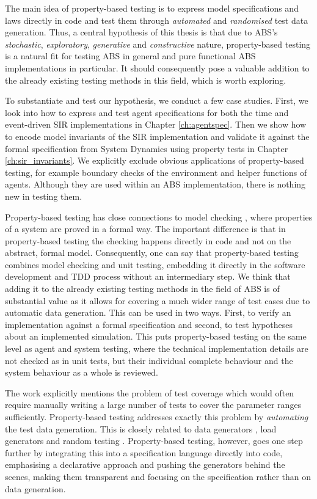 \medskip

The main idea of property-based testing is to express model specifications and laws directly in code and test them through \textit{automated} and \textit{randomised} test data generation. Thus, a central hypothesis of this thesis is that due to ABS's \textit{stochastic}, \textit{exploratory}, \textit{generative} and \textit{constructive} nature, property-based testing is a natural fit for testing ABS in general and pure functional ABS implementations in particular. It should consequently pose a valuable addition to the already existing testing methods in this field, which is worth exploring.

To substantiate and test our hypothesis, we conduct a few case studies. First, we look into how to express and test agent specifications for both the time and event-driven SIR implementations in Chapter \ref{ch:agentspec}. Then we show how to encode model invariants of the SIR implementation and validate it against the formal specification from System Dynamics using property tests in Chapter \ref{ch:sir_invariants}. We explicitly exclude obvious applications of property-based testing, for example boundary checks of the environment and helper functions of agents. Although they are used within an ABS implementation, there is nothing new in testing them.

\medskip

Property-based testing has close connections to model checking \cite{mcmillan_symbolic_1993}, where properties of a system are proved in a formal way. The important difference is that in property-based testing the checking happens directly in code and not on the abstract, formal model. Consequently, one can say that property-based testing combines model checking and unit testing, embedding it directly in the software development and TDD process without an intermediary step. We think that adding it to the already existing testing methods in the field of ABS is of substantial value as it allows for covering a much wider range of test cases due to automatic data generation. This can be used in two ways. First, to verify an implementation against a formal specification and second, to test hypotheses about an implemented simulation. This puts property-based testing on the same level as agent and system testing, where the technical implementation details are not checked as in unit tests, but their individual complete behaviour and the system behaviour as a whole is reviewed.

The work \cite{onggo_test-driven_2016} explicitly mentions the problem of test coverage which would often require manually writing a large number of tests to cover the parameter ranges sufficiently. Property-based testing addresses exactly this problem by \textit{automating} the test data generation. This is closely related to data generators \cite{gurcan_generic_2013}, load generators and random testing \cite{burnstein_practical_2010}. Property-based testing, however, goes one step further by integrating this into a specification language directly into code, emphasising a declarative approach and pushing the generators behind the scenes, making them transparent and focusing on the specification rather than on data generation. 

